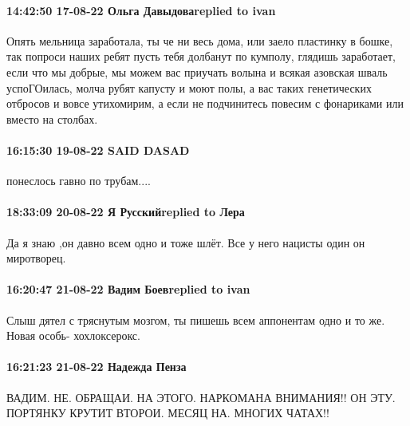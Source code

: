  
 
 
 
 

\paragraph{14:42:50 17-08-22 Ольга Давыдоваreplied to ivan}

Опять мельница заработала, ты че ни весь дома, или заело пластинку в бошке, так
попроси наших ребят пусть тебя долбанут по кумполу, глядишь заработает, если
что мы добрые, мы можем вас приучать волына и всякая азовская шваль
успоГОилась, молча рубят капусту и моют полы, а вас таких генетических отбросов
и вовсе утихомирим, а если не подчинитесь повесим с фонариками или вместо на
столбах.

\paragraph{16:15:30 19-08-22 SAID DASAD}

понеслось гавно по трубам....

\paragraph{18:33:09 20-08-22 Я Русскийreplied to Лера}

Да я знаю ,он давно всем одно и тоже шлёт. Все у него нацисты один он
миротворец.

\paragraph{16:20:47 21-08-22 Вадим Боевreplied to ivan}

Слыш дятел с тряснутым мозгом, ты пишешь всем аппонентам одно и то же. Новая
особь- хохлоксерокс.

\paragraph{16:21:23 21-08-22 Надежда Пенза}

ВАДИМ. НЕ. ОБРАЩАИ. НА ЭТОГО. НАРКОМАНА ВНИМАНИЯ!! ОН ЭТУ. ПОРТЯНКУ КРУТИТ
ВТОРОИ. МЕСЯЦ НА. МНОГИХ ЧАТАХ!!
